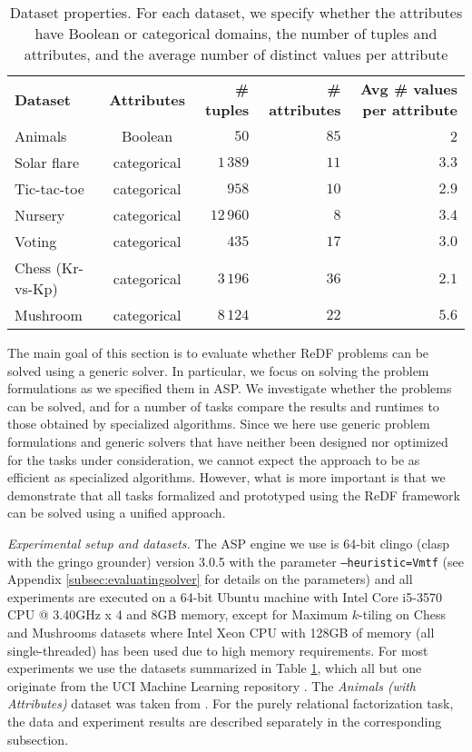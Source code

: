 
\begin{table}[b]
 \caption{Dataset properties. For each dataset,  we specify whether the attributes have Boolean or categorical domains, the number of tuples and attributes, and the average number of distinct values per attribute}
 \label{table:dataset_description}
\begin{tabular}{lcrrr}
\textbf{Dataset} & \textbf{Attributes} & \textbf{\# tuples} & \textbf{\# attributes} & \textbf{Avg \# values per attribute}  \\
Animals          & Boolean         &  $50$  &  $85$  &  2  \\
Solar flare      & categorical &  $1\,389$  &  $11$  &  $3.3$  \\
Tic-tac-toe      & categorical  &  $958$  &  $10$  &  $2.9$  \\
Nursery          & categorical &  $12\,960$  & $8$  &  $3.4$  \\
Voting           & categorical &  $435$  &  $17$  &  $3.0$  \\
Chess (Kr-vs-Kp) & categorical &  $3\,196$  &  $36$  &  $2.1$  \\ 
Mushroom         & categorical &  $8\,124$  &  $22$  &  $5.6$
\end{tabular}
\end{table}

The main goal of this section is to evaluate whether ReDF problems can be solved using a generic solver. In particular, we focus on solving the problem formulations as we specified them in ASP. We investigate whether the problems can be solved, and for a number of tasks compare the results and runtimes to those obtained by specialized algorithms. Since we here use generic problem formulations and generic solvers that have neither been designed nor optimized for the tasks under consideration, we cannot expect the approach to be as efficient as specialized algorithms. However, what is more important is that we demonstrate that all tasks formalized and prototyped using the ReDF framework can be solved using a unified approach.


\textit{Experimental setup and datasets.} The ASP engine we use is 64-bit clingo (clasp with the gringo grounder) version 3.0.5 with the parameter \texttt{--heuristic=Vmtf} (see Appendix \ref{subsec:evaluatingsolver} for details on the parameters) and all experiments are executed on a 64-bit Ubuntu machine with Intel Core i5-3570 CPU @ 3.40GHz x 4 and 8GB memory, except for Maximum $k$-tiling on Chess and Mushrooms datasets where Intel Xeon CPU with 128GB of memory (all single-threaded) has been used due to high memory requirements. For most experiments we use the datasets summarized in Table \ref{table:dataset_description}, which all but one originate from the UCI Machine Learning repository \citep{ucidatasets}. The \emph{Animals (with Attributes)} dataset was taken from \cite{animalDataset}. For the purely relational factorization task, the data and experiment results are described separately in the corresponding subsection. 

